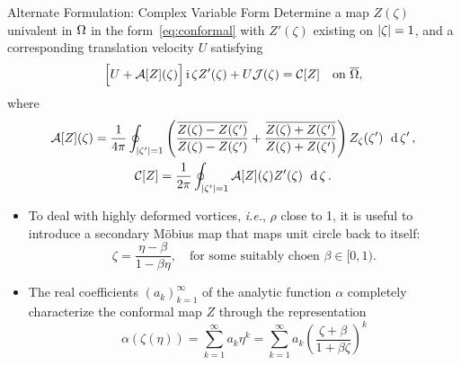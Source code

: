 \begin{alertblock}{Alternate Formulation: Complex Variable Form}
  Determine a map $Z(\zeta)$ univalent in $\Omega$ in the
  form~\eqref{eq:conformal} with $Z'(\zeta)$ existing on $\left|\zeta\right|
  = 1$, and a corresponding translation velocity $U$ satisfying
  \begin{equation}\label{eq:complex}
    \Bigl[ U + \mathcal{A}[Z](\zeta)\Bigr] \operatorname{i} \zeta Z'(\zeta)
    + U \mathcal{J}(\zeta) = \mathcal{C}[Z] \quad \text{on $\overline{\Omega}$,}
  \end{equation}
  where
  \begin{gather}
    \mathcal{A}[Z](\zeta) = \frac{1}{4\pi} \oint_{\left|\zeta'\right|=1}
    \left(
      \frac{ \overline{Z(\zeta) - Z(\zeta')} }
      { Z(\zeta) - Z(\zeta') } +
      \frac{ \overline{Z(\zeta) + Z(\zeta')} }
      { Z(\zeta) + Z(\zeta') }
    \right)
    Z_{\zeta}(\zeta') \; \operatorname{\,d}\zeta' \,, \\
    \mathcal{C}[Z] = \frac{1}{2\pi} \oint_{\left|\zeta'\right|=1} \mathcal{A}[Z](\zeta) Z'(\zeta) \;\operatorname{\,d}\zeta \,.
  \end{gather}
\end{alertblock}

\begin{itemize}
\item To deal with highly deformed vortices, \textit{i.e.}, $\rho$ close to 1,
  it is useful to introduce a secondary M\"{o}bius map that maps unit
  circle back to itself:
  \begin{equation}
    \label{eqmobius}
    \zeta = \frac{\eta-\beta}{1-\beta \eta},
    \quad\text{for some suitably choen $\beta \in [0, 1)$.}
  \end{equation}
\item The real coefficients $\left( a_k \right)_{k=1}^\infty $ of the analytic
  function $\alpha$ completely characterize the conformal map $Z$ through the
  representation
  \begin{equation}
    \label{eq1:analytic}
    \alpha \left ( \zeta (\eta) \right ) =
    \sum_{k=1}^\infty a_k \eta^k =
    \sum_{k=1}^\infty a_k \left ( \frac{\zeta+\beta}{1+\beta \zeta} \right )^k
  \end{equation}
\end{itemize}


